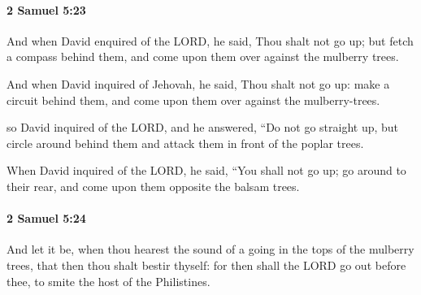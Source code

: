 		\paragraph{2 Samuel 5:23} %
			\label{2SAMUEL-5-23}

			And when David enquired of the LORD, he said, Thou shalt not go up; but fetch a compass behind them, and come upon them over against the mulberry trees.

			\begin{versebox}
					\item[BHS] 
					\item[ASV] And when David inquired of Jehovah, he said, Thou shalt not go up: make a circuit behind them, and come upon them over against the mulberry-trees.
					\item[NIV] so David inquired of the LORD, and he answered, “Do not go straight up, but circle around behind them and attack them in front of the poplar trees.
					\item[NRSV] When David inquired of the LORD, he said, “You shall not go up; go around to their rear, and come upon them opposite the balsam trees.
			\end{versebox}

		\paragraph{2 Samuel 5:24} %
			\label{2SAMUEL-5-24}

			And let it be, when thou hearest the sound of a going in the tops of the mulberry trees, that then thou shalt bestir thyself: for then shall the LORD go out before thee, to smite the host of the Philistines.

